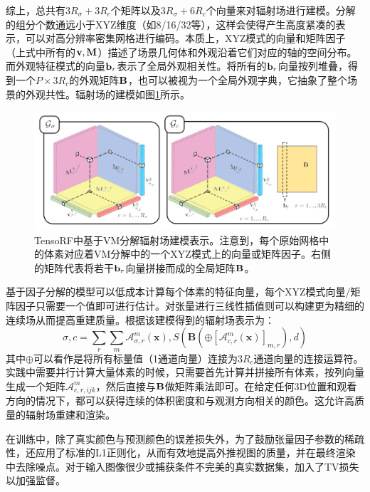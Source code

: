 \documentclass[10pt,twocolumn,letterpaper]{article}
\begin{document}
综上，总共有$3R_\sigma+3R_c$个矩阵以及$3R_\sigma+6R_c$个向量来对辐射场进行建模。分解的组分个数通远小于XYZ维度（如8/16/32等），这样会使得产生高度紧凑的表示，可以对高分辨率密集网格进行编码。本质上，XYZ模式的向量和矩阵因子（上式中所有的$\bold v,\bold M$）描述了场景几何体和外观沿着它们对应的轴的空间分布。而外观特征模式的向量$\bold b_r$表示了全局外观相关性。将所有的$\bold b_r$向量按列堆叠，得到一个$P\times3R_c$的外观矩阵$\bold B$，也可以被视为一个全局外观字典，它抽象了整个场景的外观共性。辐射场的建模如图\ref{fig:tensorf}所示。

\begin{figure}[h]
  \centering
  \includegraphics[width=1.0\linewidth]{fig/tensorf_vm.png}
  \caption{TensoRF中基于VM分解辐射场建模表示。注意到，每个原始网格中的体素对应着VM分解中的一个XYZ模式上的向量或矩阵因子。右侧的矩阵代表将若干$\bold b_r$向量拼接而成的全局矩阵$\bold B$。}
  \label{fig:tensorf}
\end{figure}

基于因子分解的模型可以低成本计算每个体素的特征向量，每个XYZ模式向量/矩阵因子只需要一个值即可进行估计。对张量进行三线性插值则可以构建更为精细的连续场从而提高重建质量。根据该建模得到的辐射场表示为：
\begin{equation}
  \sigma, c=\sum_{r} \sum_{m} \mathcal{A}_{\sigma, r}^{m}(\mathbf{x}), S\left(\mathbf{B}\left(\oplus\left[\mathcal{A}_{c, r}^{m}(\mathbf{x})\right]_{m, r}\right), d\right)
\end{equation}
\label{eq:10}
其中$\oplus$可以看作是将所有标量值（1通道向量）连接为$3R_c$通道向量的连接运算符。实践中需要并行计算大量体素的时候，只需要首先计算并拼接所有体素，按列向量生成一个矩阵$\mathcal A^m_{c,r,ijk}$，然后直接与$\bold B$做矩阵乘法即可。在给定任何3D位置和观看方向的情况下，都可以获得连续的体积密度和与观测方向相关的颜色。这允许高质量的辐射场重建和渲染。

在训练中，除了真实颜色与预测颜色的误差损失外，为了鼓励张量因子参数的稀疏性，还应用了标准的L1正则化，从而有效地提高外推视图的质量，并在最终渲染中去除噪点。对于输入图像很少或捕获条件不完美的真实数据集，加入了TV损失以加强监督。
\end{document}
